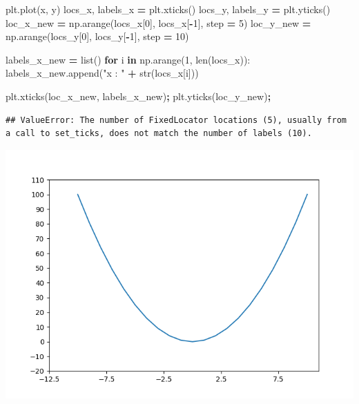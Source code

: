 \documentclass[
  12pt,
]{book}
\newenvironment{Shaded}{\begin{snugshade}}{\end{snugshade}}
\newcommand{\BuiltInTok}[1]{#1}
\newcommand{\ControlFlowTok}[1]{\textcolor[rgb]{0.13,0.29,0.53}{\textbf{#1}}}
\newcommand{\DecValTok}[1]{\textcolor[rgb]{0.00,0.00,0.81}{#1}}
\newcommand{\KeywordTok}[1]{\textcolor[rgb]{0.13,0.29,0.53}{\textbf{#1}}}
\newcommand{\NormalTok}[1]{#1}
\newcommand{\OperatorTok}[1]{\textcolor[rgb]{0.81,0.36,0.00}{\textbf{#1}}}
\newcommand{\StringTok}[1]{\textcolor[rgb]{0.31,0.60,0.02}{#1}}
\numberwithin{equation}{section}
\numberwithin{countremarque}{section}
\begin{document}
\begin{Shaded}
\begin{Highlighting}[]
\NormalTok{plt.plot(x, y)}
\NormalTok{locs\_x, labels\_x }\OperatorTok{=}\NormalTok{ plt.xticks()}
\NormalTok{locs\_y, labels\_y }\OperatorTok{=}\NormalTok{ plt.yticks()}
\NormalTok{loc\_x\_new }\OperatorTok{=}\NormalTok{ np.arange(locs\_x[}\DecValTok{0}\NormalTok{], locs\_x[}\OperatorTok{{-}}\DecValTok{1}\NormalTok{], step }\OperatorTok{=} \DecValTok{5}\NormalTok{)}
\NormalTok{loc\_y\_new }\OperatorTok{=}\NormalTok{ np.arange(locs\_y[}\DecValTok{0}\NormalTok{], locs\_y[}\OperatorTok{{-}}\DecValTok{1}\NormalTok{], step }\OperatorTok{=} \DecValTok{10}\NormalTok{)}

\NormalTok{labels\_x\_new }\OperatorTok{=} \BuiltInTok{list}\NormalTok{()}
\ControlFlowTok{for}\NormalTok{ i }\KeywordTok{in}\NormalTok{ np.arange(}\DecValTok{1}\NormalTok{, }\BuiltInTok{len}\NormalTok{(locs\_x)):}
\NormalTok{        labels\_x\_new.append(}\StringTok{"x : "} \OperatorTok{+} \BuiltInTok{str}\NormalTok{(locs\_x[i]))}

\NormalTok{plt.xticks(loc\_x\_new, labels\_x\_new)}\OperatorTok{;}
\NormalTok{plt.yticks(loc\_y\_new)}\OperatorTok{;}
\end{Highlighting}
\end{Shaded}

\begin{lstlisting}
## ValueError: The number of FixedLocator locations (5), usually from a call to set_ticks, does not match the number of labels (10).
\end{lstlisting}

\begin{center}\includegraphics[width=9.03in]{figs/pyplot/plot_ticks_3} \end{center}
\end{document}
